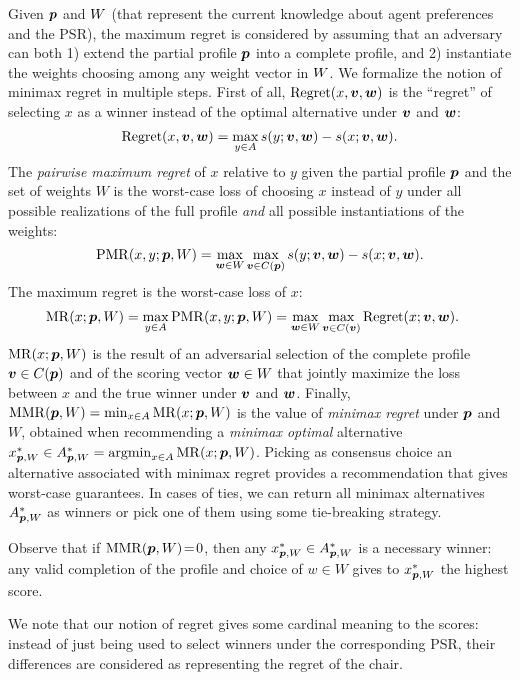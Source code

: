 \documentclass[runningheads]{llncs}
\theoremstyle{remark}
\begin{document}
Given ${\bm{p}}$ and $W$ (that represent the current knowledge about agent preferences and the PSR),
the maximum regret is considered by assuming that an adversary can both 1) extend the partial profile ${\bm{p}}$ into a complete profile, and 2) instantiate the weights choosing among any weight vector in $W$. %
We formalize the notion of minimax regret in multiple steps.
First of all, $\operatorname{Regret}(x, \bm{v}, \bm{w})$
is the “regret” of selecting $x$ as a winner instead of the optimal alternative under $\bm{v}$ and $\bm{w}$:
$$\operatorname{Regret}(x, \bm{v}, \bm{w}) = \max_{y \in A} s(y; \bm{v},\bm{w}) - s(x; \bm{v}, \bm{w}).$$
The {\em pairwise maximum regret} of $x$ relative to $y$ given the partial profile ${\bm{p}}$ and the set of weights $W$ is the worst-case loss of choosing $x$ instead of $y$ under all possible realizations of the full profile {\em and} all possible instantiations of the weights:
$$\operatorname{PMR}(x,y;{\bm{p}},W) = \max_{\bm{w} \in W} \max_{\bm{v} \in C({\bm{p}})} s(y; \bm{v},\bm{w}) - s(x; \bm{v},\bm{w}).$$
The maximum regret %
is the worst-case loss of $x$:
\begin{align}
	\operatorname{MR}(x;{\bm{p}},W) & = \max_{y \in A} \operatorname{PMR}(x,y; {\bm{p}}, W) = \max_{\bm{w} \in W} \max_{\bm{v} \in C(\bm{v})} \operatorname{Regret}(x; \bm{v}, \bm{w}).
\end{align}
$\operatorname{MR}(x;{\bm{p}},W)$ is the result of an adversarial selection of the complete profile $\bm{v} \in C({\bm{p}})$ and of the scoring vector $\bm{w} \in W$ that jointly maximize the loss between $x$ and the true winner under $\bm{v}$ and $\bm{w}$.
Finally,  $\operatorname{MMR}({\bm{p}},W) = \min_{x \in A} \operatorname{MR}(x;{\bm{p}},W)$ is the value of {\em minimax regret} under ${\bm{p}}$ and $W$, obtained when recommending a {\em minimax optimal} alternative $x^*_{{\bm{p}}, W} \in A^*_{{\bm{p}}, W} = \operatorname*{argmin}_{x \in A} \operatorname{MR}(x;{\bm{p}},W)$.
Picking as consensus choice an alternative associated with minimax regret provides a recommendation that gives worst-case guarantees. 
In cases of ties, %
we can return all minimax alternatives $A^*_{{\bm{p}}, W}$ as winners or pick one of them using some tie-breaking strategy.

Observe that if $\operatorname{MMR}({\bm{p}}, W)\!=\!0$, then any $x^{*}_{{\bm{p}},W} \in A^*_{{\bm{p}}, W}$ is a necessary winner: any valid completion of the profile and choice of $w \in W$ gives to $x^{*}_{{\bm{p}},W}$ the highest score.

We note that our notion of regret gives some cardinal meaning to the scores: instead of just being used to select winners under the corresponding PSR, their differences are considered as representing the regret of the chair.
\end{document}
